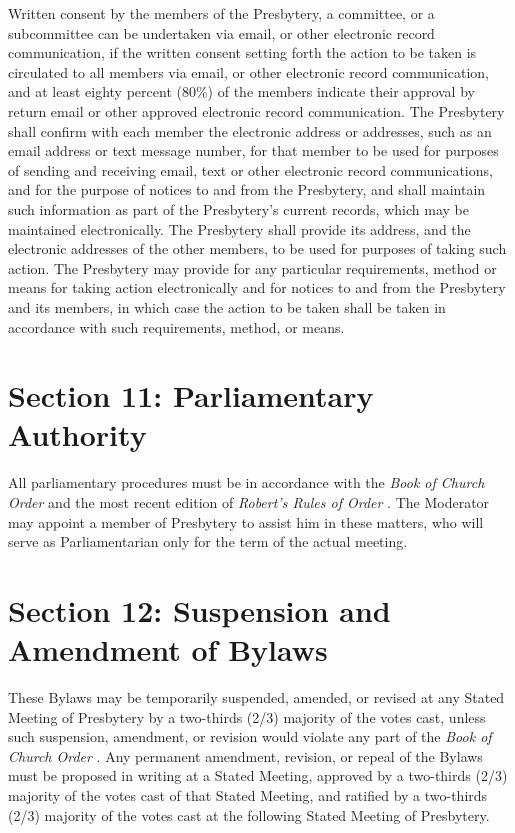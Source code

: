 \documentclass[
]{book}
\begin{document}
Written consent by the members of the Presbytery, a committee, or a subcommittee can be undertaken via email, or other electronic record communication, if the written consent setting forth the action to be taken is circulated to all members via email, or other electronic record communication, and at least eighty percent (80\%) of the members indicate their approval by return email or other approved electronic record communication. The Presbytery shall confirm with each member the electronic address or addresses, such as an email address or text message number, for that member to be used for purposes of sending and receiving email, text or other electronic record communications, and for the purpose of notices to and from the Presbytery, and shall maintain such information as part of the Presbytery's current records, which may be maintained electronically. The Presbytery shall provide its address, and the electronic addresses of the other members, to be used for purposes of taking such action. The Presbytery may provide for any particular requirements, method or means for taking action electronically and for notices to and from the Presbytery and its members, in which case the action to be taken shall be taken in accordance with such requirements, method, or means.

\hypertarget{section-11-parliamentary-authority}{%
\section*{Section 11: Parliamentary Authority}\label{section-11-parliamentary-authority}}

All parliamentary procedures must be in accordance with the \emph{Book of Church Order} and the most recent edition of \emph{Robert's Rules of Order} . The Moderator may appoint a member of Presbytery to assist him in these matters, who will serve as Parliamentarian only for the term of the actual meeting.

\hypertarget{section-12-suspension-and-amendment-of-bylaws}{%
\section*{Section 12: Suspension and Amendment of Bylaws}\label{section-12-suspension-and-amendment-of-bylaws}}

These Bylaws may be temporarily suspended, amended, or revised at any Stated Meeting of Presbytery by a two-thirds (2/3) majority of the votes cast, unless such suspension, amendment, or revision would violate any part of the \emph{Book of Church Order} . Any permanent amendment, revision, or repeal of the Bylaws must be proposed in writing at a Stated Meeting, approved by a two-thirds (2/3) majority of the votes cast of that Stated Meeting, and ratified by a two-thirds (2/3) majority of the votes cast at the following Stated Meeting of Presbytery.
\end{document}
